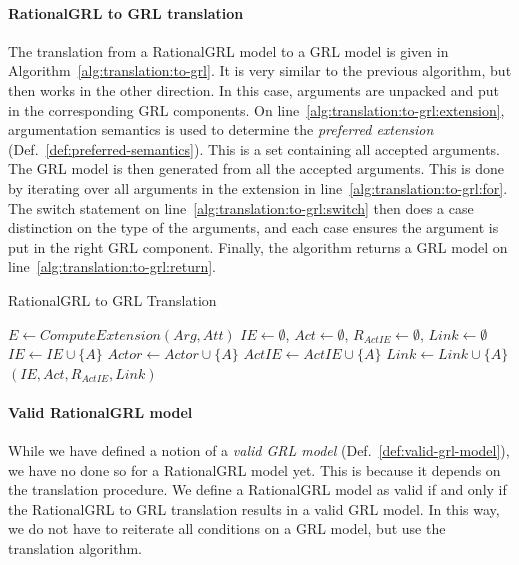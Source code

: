 \paragraph{RationalGRL to GRL translation} The translation from a RationalGRL model to a GRL model is given in Algorithm~\ref{alg:translation:to-grl}. It is very similar to the previous algorithm, but then works in the other direction. In this case, arguments are unpacked and put in the corresponding GRL components. On line~\ref{alg:translation:to-grl:extension}, argumentation semantics is used to determine the \emph{preferred extension} (Def.~\ref{def:preferred-semantics}). This is a set containing all accepted arguments. The GRL model is then generated from all the accepted arguments. This is done by iterating over all arguments in the extension in line~\ref{alg:translation:to-grl:for}. The switch statement on line~\ref{alg:translation:to-grl:switch} then does a case distinction on the type of the arguments, and each case ensures the argument is put in the right GRL component. Finally, the algorithm returns a GRL model on line~\ref{alg:translation:to-grl:return}.

\begin{algorithm}[h]
  \caption{RationalGRL to GRL Translation}
  \label{alg:translation:to-grl}
  \begin{algorithmic}[1]
    \State $E \leftarrow ComputeExtension(Arg,Att)$\label{alg:translation:to-grl:extension}
    \State $IE\leftarrow\emptyset$, $Act\leftarrow\emptyset$, $R_{ActIE}\leftarrow\emptyset$, $Link\leftarrow \emptyset$
    \label{alg:translation:to-grl:for}
      \label{alg:translation:to-grl:switch}
            \State $IE\leftarrow IE\cup \{A\}$
          \EndCase
            \State $Actor\leftarrow Actor\cup \{A\}$
          \EndCase
            \State $ActIE\leftarrow ActIE\cup \{A\}$
          \EndCase
            \State $Link\leftarrow Link \cup\{A\}$
          \EndCase
      \EndSwitch
    \EndFor
    \State \Return $(IE,Act,R_{ActIE}, Link)$\label{alg:translation:to-grl:return}
    \EndProcedure
  \end{algorithmic}
\end{algorithm}

\paragraph{Valid RationalGRL model} While we have defined a notion of a \emph{valid GRL model} (Def.~\ref{def:valid-grl-model}), we have no  done so for a RationalGRL model yet. This is because it depends on the translation procedure. We define a RationalGRL model as valid if and only if the RationalGRL to GRL translation results in a valid GRL model. In this way, we do not have to reiterate all conditions on a GRL model, but use the translation algorithm.

